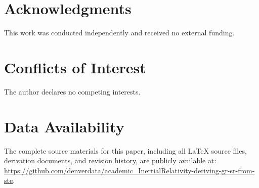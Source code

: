 \balance

\section*{Acknowledgments}
This work was conducted independently and received no external funding.

\section*{Conflicts of Interest}
The author declares no competing interests.

\section*{Data Availability}
The complete source materials for this paper, including all \LaTeX{} source files, derivation documents, and revision history, are publicly available at: \url{https://github.com/denverdata/academic_InertialRelativity-deriving-gr-sr-from-ste}.




